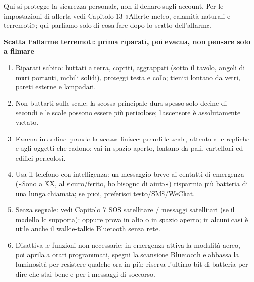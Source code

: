 


Qui si protegge la sicurezza personale, non il denaro sugli account. Per le impostazioni di allerta vedi Capitolo 13 «Allerte meteo, calamità naturali e terremoti»; qui parliamo solo di cosa fare dopo lo scatto dell'allarme.

\textbf{Scatta l'allarme terremoti: prima riparati, poi evacua, non pensare solo a filmare}\par

\begin{enumerate}
  \item Riparati subito: buttati a terra, copriti, aggrappati (sotto il tavolo, angoli di muri portanti, mobili solidi), proteggi testa e collo; tieniti lontano da vetri, pareti esterne e lampadari.
  \item Non buttarti sulle scale: la scossa principale dura spesso solo decine di secondi e le scale possono essere più pericolose; l'ascensore è assolutamente vietato.
  \item Evacua in ordine quando la scossa finisce: prendi le scale, attento alle repliche e agli oggetti che cadono; vai in spazio aperto, lontano da pali, cartelloni ed edifici pericolosi.
  \item Usa il telefono con intelligenza: un messaggio breve ai contatti di emergenza («Sono a XX, al sicuro/ferito, ho bisogno di aiuto») risparmia più batteria di una lunga chiamata; se puoi, preferisci testo/SMS/WeChat.
  \item Senza segnale: vedi Capitolo 7 SOS satellitare / messaggi satellitari (se il modello lo supporta); oppure prova in alto o in spazio aperto; in alcuni casi è utile anche il walkie-talkie Bluetooth senza rete.
  \item Disattiva le funzioni non necessarie: in emergenza attiva la modalità aereo, poi aprila a orari programmati, spegni la scansione Bluetooth e abbassa la luminosità per resistere qualche ora in più; riserva l'ultimo bit di batteria per dire che stai bene e per i messaggi di soccorso.
\end{enumerate}

